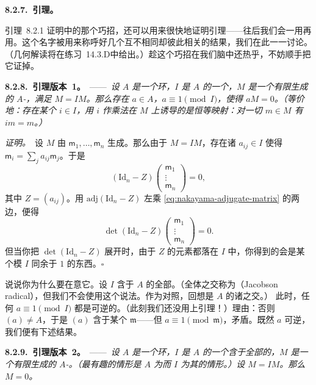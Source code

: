 \textbf{8.2.7.\ \trNakayama{}引理。}

引理~8.2.1 证明中的那个巧招，还可以用来很快地证明\trNakayama{}引理——往后我们会一用再用。这个名字被用来称呼好几个互不相同却彼此相关的结果，我们在此一一讨论。（几何解读将在\mbox{练习~14.3.D}中给出。）趁这个巧招在我们脑中还热乎，不妨顺手把它证掉。

\textbf{8.2.8.\ \trNakayama{}引理版本~1。}\ ——\ \emph{设 $A$ 是一个环，$I$ 是 $A$ 的一个\trIdeal，$M$ 是一个有限生成的 $A$-\trModule，满足 $M=IM$。那么存在 $a\in A$，$a\equiv 1\pmod{I}$，使得 $aM=0$。（等价地：存在某个 $i\in I$，用 $i$ 作乘法在 $M$ 上诱导的是恒等映射：对一切 $m\in M$ 有 $im=m$。）}

\emph{证明。}\ 设 $M$ 由 $\mathsf{m}_1,\dots,\mathsf{m}_n$ 生成。那么由于 $M=IM$，存在诸 $a_{ij}\in I$ 使得 $\mathsf{m}_i=\sum_j a_{ij}\mathsf{m}_j$。于是
\begin{equation*}\tag{8.2.8.1}\label{eq:nakayama-adjugate-matrix}
(\mathrm{Id}_n-Z)
\begin{pmatrix}\mathsf{m}_1\\ \vdots\\ \mathsf{m}_n\end{pmatrix}
=0,
\end{equation*}
其中 $Z=(a_{ij})$。用 $\mathrm{adj}(\mathrm{Id}_n-Z)$ 左乘 \eqref{eq:nakayama-adjugate-matrix} 的两边，便得
\[
\det(\mathrm{Id}_n-Z)
\begin{pmatrix}\mathsf{m}_1\\ \vdots\\ \mathsf{m}_n\end{pmatrix}
=0.
\]
但当你把 $\det(\mathrm{Id}_n-Z)$ 展开时，由于 $Z$ 的元素都落在 $I$ 中，你得到的会是某个模 $I$ 同余于 $1$ 的东西。\hfill$\square$

说说你为什么要在意它。设 $I$ 含于 $A$ 的全部\trMaximalIdeal{}。（全体\trMaximalIdeal{}之交称为\textbf{\trJacobsonRadical{}}（Jacobson radical），但我们不会使用这个说法。作为对照，回想\trNilradical{}是 $A$ 的诸\emph{\trPrimeIdeal}之交。）%
此时，任何 $a\equiv 1\pmod{I}$ 都是可逆的。（此刻我们还没用上\trNakayama{}引理！）理由：否则 $(a)\neq A$，于是\trIdeal{} $(a)$ 含于某个\trMaximalIdeal{} $\mathfrak{m}$——但 $a\equiv 1\pmod{\mathfrak{m}}$，矛盾。既然 $a$ 可逆，我们便有下述结果。

\textbf{8.2.9.\ \trNakayama{}引理版本~2。}\ ——\ \emph{设 $A$ 是一个环，$I$ 是 $A$ 的一个含于全部\trMaximalIdeal{}的\trIdeal，$M$ 是一个有限生成的 $A$-\trModule。（最有趣的情形是 $A$ 为\trLocalRing{}而 $I$ 为其\trMaximalIdeal{}的情形。）设 $M=IM$。那么 $M=0$。}

